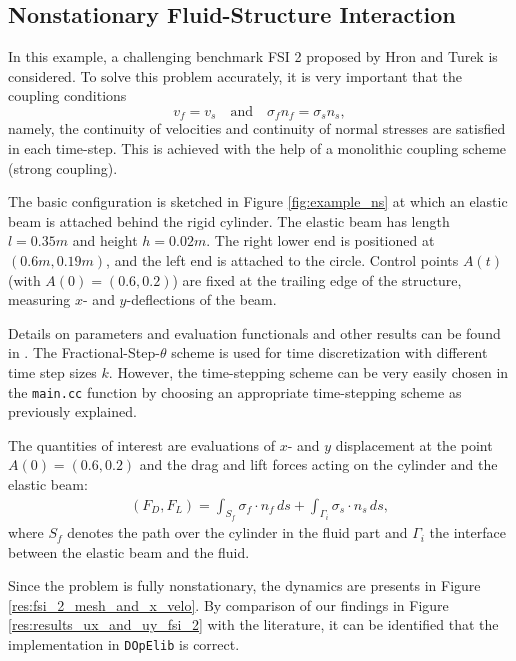 \documentclass[smallextended]{svjour3}       %
\numberwithin{equation}{section}
\newcommand{\dope}{\texttt{DOpElib}}
\begin{document}
\subsection{Nonstationary Fluid-Structure Interaction}
In this example, a challenging benchmark FSI 2
proposed by Hron and Turek \cite{HrTu06b} is considered.
To solve this problem accurately, it is very important that 
the coupling conditions
\[
v_f = v_s \quad \text{and} \quad \sigma_f n_f = \sigma_s n_s, 
\]
namely, the continuity of velocities and continuity of normal stresses
are satisfied in each time-step. This is achieved with the help of 
a monolithic coupling scheme (strong coupling).

The basic configuration is 
sketched in Figure \ref{fig:example_ns} at which an elastic beam is attached 
behind the rigid cylinder. 
The elastic beam has length
$l=0.35m$ and height $h=0.02m$. The right lower end is positioned at 
$(0.6m,0.19m)$, and
the left end is attached to the circle. 
Control points $A(t)$ (with $A(0) = (0.6,0.2)$) are fixed at the 
trailing edge of the structure, measuring $x$- and $y$-deflections of the beam.

Details 
on parameters and evaluation functionals and other results 
can be found in \cite{HrTu06b,BuSc06,DeHaeAnnBrVie10,Wi11}. 
The Fractional-Step-$\theta$ scheme is used for time discretization with
different time step sizes $k$. However, the time-stepping scheme can be 
very easily chosen in the \texttt{main.cc} function by choosing an appropriate 
time-stepping scheme as previously explained.

The quantities of interest are evaluations of 
$x$- and $y$ displacement at the point $A(0) = (0.6,0.2)$
and the drag and lift forces acting on the cylinder and the elastic beam:
\begin{align}
\label{drag_lift_forces}
(F_D , F_L) 
= {\int_{S_f} \sigma_f \cdot n_f \, ds + 
\int_{\Gamma_i} \sigma_s \cdot n_s \, ds},
\end{align}
where $S_{f}$ denotes the path over the cylinder in the fluid part and
$\Gamma_i$ the interface between the elastic beam and the 
fluid.

Since the problem is fully nonstationary, the 
dynamics are presents in Figure \ref{res:fsi_2_mesh_and_x_velo}. 
By comparison of our findings in Figure \ref{res:results_ux_and_uy_fsi_2}
with the literature, it can be identified that 
the implementation in \dope{} is correct.
\end{document}
